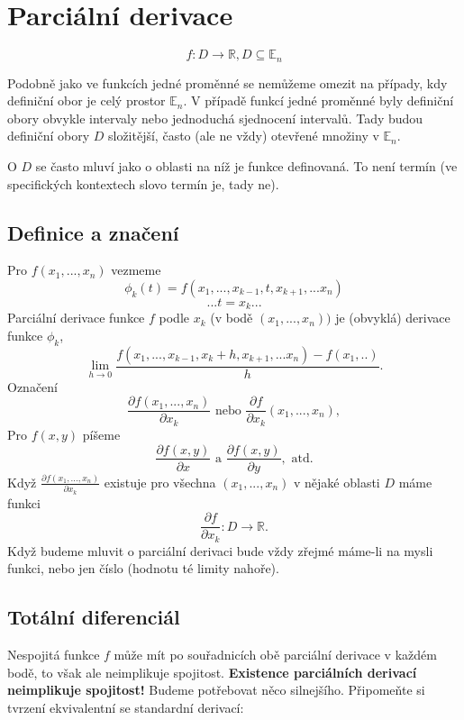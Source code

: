 \documentclass[../main.tex]{subfiles}
\begin{document}
\section{Parciální derivace}

\begin{definition}
	\[f: D \rightarrow \mathbb{R}, D \subseteq \mathbb{E}_n\]
\end{definition}

Podobně jako ve funkcích jedné proměnné se nemůžeme omezit na případy, kdy definiční obor je celý prostor $\mathbb{E}_n$.  
V případě funkcí jedné proměnné byly definiční obory obvykle intervaly nebo jednoduchá sjednocení intervalů. Tady budou definiční
obory $D$ složitější, často (ale ne vždy) otevřené množiny v $\mathbb{E}_n$.

O $D$ se často mluví jako o oblasti na níž je funkce definovaná. To není termín (ve specifických kontextech slovo  termín 
je, tady ne).


\subsection{Definice a značení}
\begin{definition}
	Pro $f(x_1,...,x_n)$ vezmeme 
	\[\phi_k(t) = f(x_1,...,x_{k-1},t,x_{k+1},...x_n)\]
	\[... t = x_k...\]
	Parciální derivace funkce $f$ podle $x_k$ (v bodě $(x_1,...,x_n))$ je (obvyklá) derivace funkce $\phi_k$,
	\[\lim_{h\rightarrow 0}\frac{f(x_1,...,x_{k-1},x_k+h,x_{k+1},...x_n) - f(x_1,..)}{h}.\]
	Označení
	\[\frac{\partial f(x_1,...,x_n)}{\partial x_k} \textrm{ nebo } \frac{\partial f}{\partial x_k} (x_1,...,x_n),\]
	Pro $f(x,y)$ píšeme
	\[\frac{\partial f(x,y)}{\partial x} \textrm{ a } \frac{\partial f(x,y)}{\partial y}, \textrm{ atd.}\]
	Když $\frac{\partial f(x_1,...,x_n)}{\partial x_k}$ existuje pro všechna $(x_1,...,x_n)$ v nějaké oblasti $D$ máme funkci
	\[\frac{\partial f}{\partial x_k}: D \rightarrow \mathbb{R}.\]
	Když budeme mluvit o parciální derivaci bude vždy zřejmé máme-li na mysli funkci, nebo jen číslo (hodnotu té limity nahoře).
\end{definition}

\subsection{Totální diferenciál}
Nespojitá funkce $f$ může mít po souřadnicích obě parciální derivace v každém bodě, to však ale neimplikuje spojitost. \textbf{Existence parciálních derivací neimplikuje spojitost!}
Budeme potřebovat něco silnejšího. Připomeňte si tvrzení ekvivalentní se standardní derivací:
\end{document}
